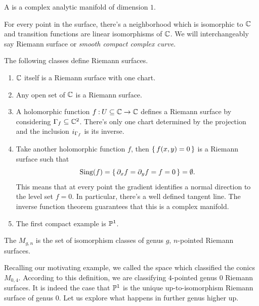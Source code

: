 \documentclass[12pt]{memoir}
\begin{document}
\begin{Def}
    A  is a complex analytic manifold of dimension $1$. 
\end{Def}

For every point in the surface, there's a neighborhood which is isomorphic to $\mathbb{C}$ and transition functions are linear isomorphisms of $\mathbb{C}$. We will interchangeably say Riemann surface or \emph{smooth compact complex curve}.
    
\begin{Ex}
        The following classes define Riemann surfaces.
        \begin{enumerate}
        \item $\mathbb{C}$ itself is a Riemann surface with one chart.
        \item Any open set of $\mathbb{C}$ is a Riemann surface.
        \item A holomorphic function $f\mathbin{:} U\subseteq\mathbb{C}\to\mathbb{C}$ defines a Riemann surface by considering $\Gamma_f\subseteq\mathbb{C}^2$. There's only one chart determined by the projection and the inclusion $i_{\Gamma_f}$ is its inverse.
        \item Take another holomorphic function $f$, then $\{\,f(x,y)=0\,\}$ is a Riemann surface such that 
        $$\text{Sing}(f)=\{\,\partial_xf=\partial_yf=f=0\,\}=\emptyset.$$
        This means that at every point the gradient identifies a normal direction to the level set $f=0$. In particular, there's a well defined tangent line. The inverse function theorem guarantees that this is a complex manifold. 
        \item The first compact example is $\mathbb{P}^1$.
        \end{enumerate}
\end{Ex} 

\begin{Def}
    The  $M_{g,n}$ is the set of isomorphism classes of genus $g$, $n$-pointed Riemann surfaces.
\end{Def}

Recalling our motivating example, we called the space which classified the conics $M_{0,4}$. According to this definition, we are classifying $4$-pointed genus 0 Riemann surfaces. It is indeed the case that $\mathbb{P}^1$ is the unique up-to-isomorphism Riemann surface of genus 0. Let us explore what happens in further genus higher up.
\end{document}
